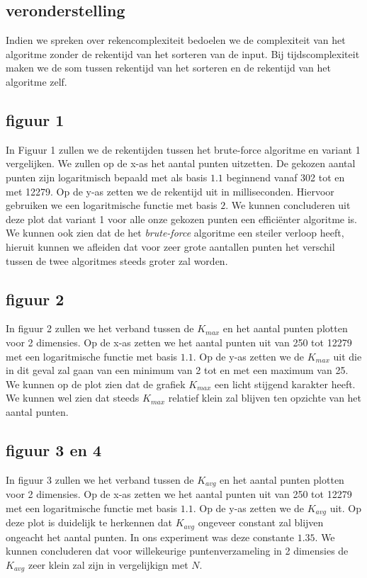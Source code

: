 \documentclass[12pt]{article}
\begin{document}
\subsection{veronderstelling}
Indien we spreken over rekencomplexiteit bedoelen we de complexiteit van het algoritme zonder de rekentijd van het sorteren van de input.
Bij tijdscomplexiteit maken we de som tussen rekentijd van het sorteren en de rekentijd van het algoritme zelf.

\subsection{figuur 1}
In Figuur 1 zullen we de rekentijden tussen het brute-force algoritme en variant 1 vergelijken.
We zullen op de x-as het aantal punten uitzetten.
De gekozen aantal punten zijn logaritmisch bepaald met als basis $1.1$ beginnend vanaf 302 tot en met 12279.
Op de y-as zetten we de rekentijd uit in milliseconden. Hiervoor gebruiken we een logaritmische functie met basis $2$.
We kunnen concluderen uit deze plot dat variant 1 voor alle onze gekozen punten een efficiënter algoritme is.
We kunnen ook zien dat de het \textit{brute-force} algoritme een steiler verloop heeft, hieruit kunnen we afleiden dat voor zeer grote aantallen punten het verschil tussen de twee algoritmes steeds groter zal worden.

\subsection{figuur 2}
In figuur 2 zullen we het verband tussen de $K_{max}$ en het aantal punten plotten voor 2 dimensies.
Op de x-as zetten we het aantal punten uit van 250 tot 12279 met een logaritmische functie met basis $1.1$.
Op de y-as zetten we de $K_{max}$ uit die in dit geval zal gaan van een minimum van 2 tot en met een maximum van 25.
We kunnen op de plot zien dat de grafiek $K_{max}$ een licht stijgend karakter heeft.
We kunnen wel zien dat steeds $K_{max}$ relatief klein zal blijven ten opzichte van het aantal punten.

\subsection{figuur 3 en 4}
In figuur 3 zullen we het verband tussen de $K_{avg}$ en het aantal punten plotten voor 2 dimensies.
Op de x-as zetten we het aantal punten uit van 250 tot 12279 met een logaritmische functie met basis $1.1$.
Op de y-as zetten we de $K_{avg}$ uit.
Op deze plot is duidelijk te herkennen dat $K_{avg}$ ongeveer constant zal blijven ongeacht het aantal punten.
In ons experiment was deze constante $1.35$.
We kunnen concluderen dat voor willekeurige puntenverzameling in 2 dimensies de $K_{avg}$ zeer klein zal zijn in vergelijkign met $N$.
\end{document}
